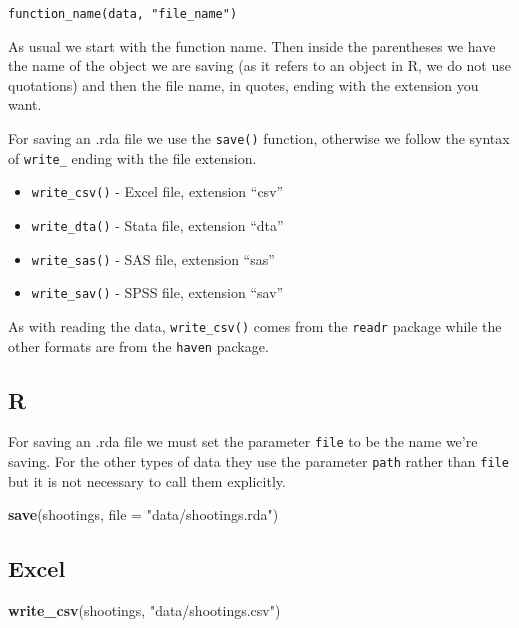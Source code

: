 \documentclass[
  12pt,
]{book}
\newenvironment{Shaded}{\begin{snugshade}}{\end{snugshade}}
\newcommand{\DataTypeTok}[1]{\textcolor[rgb]{0.27,0.27,0.27}{#1}}
\newcommand{\KeywordTok}[1]{\textcolor[rgb]{0.27,0.27,0.27}{\textbf{#1}}}
\newcommand{\NormalTok}[1]{#1}
\newcommand{\StringTok}[1]{\textcolor[rgb]{0.5,0.5,0.5}{#1}}
\providecommand{\tightlist}{%
  \setlength{\itemsep}{0pt}\setlength{\parskip}{0pt}}
\begin{document}
\texttt{function\_name(data,\ "file\_name")}

As usual we start with the function name. Then inside the parentheses we have the name of the object we are saving (as it refers to an object in R, we do not use quotations) and then the file name, in quotes, ending with the extension you want.

For saving an .rda file we use the \texttt{save()} function, otherwise we follow the syntax of \texttt{write\_} ending with the file extension.

\begin{itemize}
\tightlist
\item
  \texttt{write\_csv()} - Excel file, extension ``csv''
\item
  \texttt{write\_dta()} - Stata file, extension ``dta''
\item
  \texttt{write\_sas()} - SAS file, extension ``sas''
\item
  \texttt{write\_sav()} - SPSS file, extension ``sav''
\end{itemize}

As with reading the data, \texttt{write\_csv()} comes from the \texttt{readr} package while the other formats are from the \texttt{haven} package.

\hypertarget{r-1}{%
\subsection{R}\label{r-1}}

For saving an .rda file we must set the parameter \texttt{file} to be the name we're saving. For the other types of data they use the parameter \texttt{path} rather than \texttt{file} but it is not necessary to call them explicitly.

\begin{Shaded}
\begin{Highlighting}[]
\KeywordTok{save}\NormalTok{(shootings, }\DataTypeTok{file =}  \StringTok{"data/shootings.rda"}\NormalTok{)}
\end{Highlighting}
\end{Shaded}

\hypertarget{excel-1}{%
\subsection{Excel}\label{excel-1}}

\begin{Shaded}
\begin{Highlighting}[]
\KeywordTok{write\_csv}\NormalTok{(shootings, }\StringTok{"data/shootings.csv"}\NormalTok{)}
\end{Highlighting}
\end{Shaded}
\end{document}
